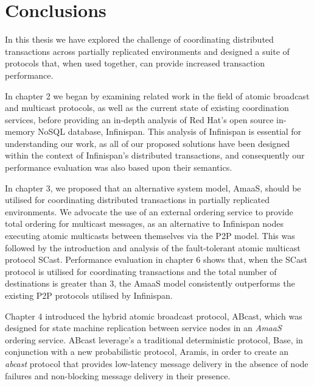 \chapter{Conclusions}

    \graphicspath{{Chapter7-Conclusions/Figs/Vector/}{Chapter3-Conclusions/Figs/}}

In this thesis we have explored the challenge of coordinating distributed transactions across partially replicated environments and designed a suite of protocols that, when used together, can provide increased transaction performance. 

In chapter 2 we began by examining related work in the field of atomic broadcast and multicast protocols, as well as the current state of existing coordination services, before providing an in-depth analysis of Red Hat's open source in-memory NoSQL database, Infinispan.  This analysis of Infinispan is essential for understanding our work, as all of our proposed solutions have been designed within the context of Infinispan's distributed transactions, and consequently our performance evaluation was also based upon their semantics.

In chapter 3, we proposed that an alternative system model, \textsf{AmaaS}, should be utilised for coordinating distributed transactions in partially replicated environments.  We advocate the use of an external ordering service to provide total ordering for multicast messages, as an alternative to Infinispan nodes executing atomic multicasts between themselves via the P2P model.  This was followed by the introduction and analysis of the fault-tolerant atomic multicast protocol \textsf{SCast}.  Performance evaluation in chapter 6 shows that, when the \textsf{SCast} protocol is utilised for coordinating transactions and the total number of destinations is greater than 3, the \textsf{AmaaS} model consistently outperforms the existing P2P protocols utilised by Infinispan.

Chapter 4 introduced the hybrid atomic broadcast protocol, \textsf{ABcast}, which was designed for state machine replication between service nodes in an \emph{AmaaS} ordering service.  \textsf{ABcast} leverage's a traditional deterministic protocol, \textsf{Base}, in conjunction with a new probabilistic protocol, \textsf{Aramis}, in order to create an \emph{abcast} protocol that provides low-latency message delivery in the absence of node failures and non-blocking message delivery in their presence.  

